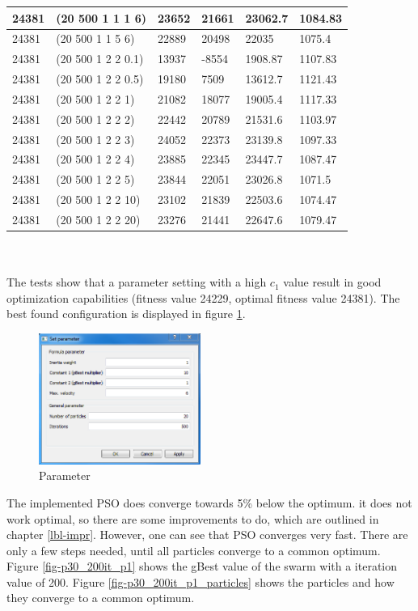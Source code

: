 \documentclass{article}
\begin{document}
\begin{tabular}{|l|l|l|l|l|l|}
	24381 & (20 500 1 1 1 6) & 23652 & 21661 & 23062.7 & 1084.83 \\ \hline
	24381 & (20 500 1 1 5 6) & 22889 & 20498 & 22035 & 1075.4 \\ \hline
	24381 & (20 500 1 2 2 0.1) & 13937 & -8554 & 1908.87 & 1107.83 \\ \hline
	24381 & (20 500 1 2 2 0.5) & 19180 & 7509 & 13612.7 & 1121.43 \\ \hline
	24381 & (20 500 1 2 2 1) & 21082 & 18077 & 19005.4 & 1117.33 \\ \hline
	24381 & (20 500 1 2 2 2) & 22442 & 20789 & 21531.6 & 1103.97 \\ \hline
	24381 & (20 500 1 2 2 3) & 24052 & 22373 & 23139.8 & 1097.33 \\ \hline
	24381 & (20 500 1 2 2 4) & 23885 & 22345 & 23447.7 & 1087.47 \\ \hline
	24381 & (20 500 1 2 2 5) & 23844 & 22051 & 23026.8 & 1071.5 \\ \hline
	24381 & (20 500 1 2 2 10) & 23102 & 21839 & 22503.6 & 1074.47 \\ \hline
	24381 & (20 500 1 2 2 20) & 23276 & 21441 & 22647.6 & 1079.47 \\ \hline
\end{tabular} \\\\

The tests show that a parameter setting with a high $c_1$ value result in good optimization capabilities (fitness value 24229, optimal fitness value 24381). The best found configuration is displayed in figure \ref{fig-param}.

\begin{figure}[H]
    \centering
    \includegraphics[width=200px]{images/parameter.PNG}
    \caption{Parameter}
    \label{fig-param}
\end{figure}

The implemented PSO does converge towards 5\% below the optimum. it does not work optimal, so there are some improvements to do, which are outlined in chapter \ref{lbl-impr}. However, one can see that PSO converges very fast. There are only a few steps needed, until all particles converge to a common optimum. Figure \ref{fig-p30_200it_p1} shows the gBest value of the swarm with a iteration value of 200. Figure \ref{fig-p30_200it_p1_particles} shows the particles and how they converge to a common optimum.
\end{document}
